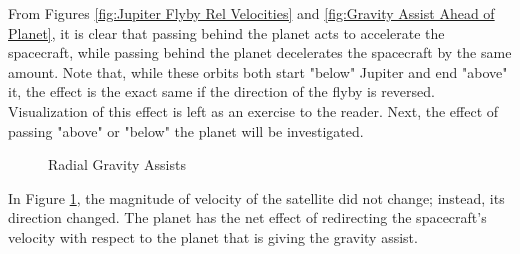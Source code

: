 \documentclass[../basicOrbitalDynamics.tex]{subfiles}
\begin{document}
From Figures \ref{fig:Jupiter Flyby Rel Velocities} and \ref{fig:Gravity Assist Ahead of Planet}, it is clear that passing behind the planet acts to accelerate the spacecraft, while passing behind the planet decelerates the spacecraft by the same amount. Note that, while these orbits both start "below" Jupiter and end "above" it, the effect is the exact same if the direction of the flyby is reversed. Visualization of this effect is left as an exercise to the reader. Next, the effect of passing "above" or "below" the planet will be investigated.

\begin{figure}[H]
    \centering
    \caption{Radial Gravity Assists}\label{fig:Gravity assists above/below}
\end{figure}

In Figure \ref{fig:Gravity assists above/below}, the magnitude of velocity of the satellite did not change; instead, its direction changed. The planet has the net effect of redirecting the spacecraft's velocity with respect to the planet that is giving the gravity assist.
\end{document}

